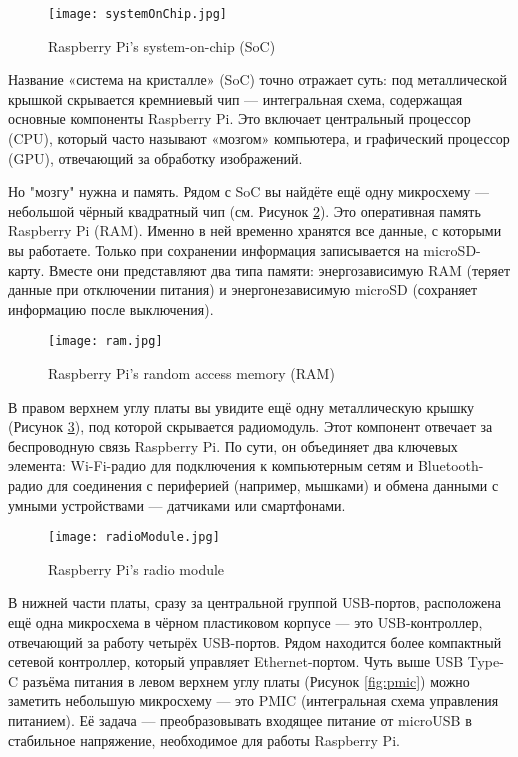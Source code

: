 \begin{figure}[H]
	\centering
	\texttt{[image: systemOnChip.jpg]}
	\caption{Raspberry Pi’s system-on-chip (SoC)}
	\label{fig:soc}
\end{figure}

Название «система на кристалле» (SoC) точно отражает суть: под металлической крышкой скрывается кремниевый чип — интегральная схема, содержащая основные компоненты Raspberry Pi. Это включает центральный процессор (CPU), который часто называют «мозгом» компьютера, и графический процессор (GPU), отвечающий за обработку изображений.

Но "мозгу" нужна и память. Рядом с SoC вы найдёте ещё одну микросхему — небольшой чёрный квадратный чип (см. Рисунок \ref{fig:ram}). Это оперативная память Raspberry Pi (RAM). Именно в ней временно хранятся все данные, с которыми вы работаете. Только при сохранении информация записывается на microSD-карту. Вместе они представляют два типа памяти: энергозависимую RAM (теряет данные при отключении питания) и энергонезависимую microSD (сохраняет информацию после выключения).

\begin{figure}[H]
	\centering
	\texttt{[image: ram.jpg]}
	\caption{Raspberry Pi’s random access memory (RAM)}
	\label{fig:ram}
\end{figure}

В правом верхнем углу платы вы увидите ещё одну металлическую крышку (Рисунок \ref{fig:radio_module}), под которой скрывается радиомодуль. Этот компонент отвечает за беспроводную связь Raspberry Pi. По сути, он объединяет два ключевых элемента: Wi-Fi-радио для подключения к компьютерным сетям и Bluetooth-радио для соединения с периферией (например, мышками) и обмена данными с умными устройствами — датчиками или смартфонами.

\begin{figure}[H]
	\centering
	\texttt{[image: radioModule.jpg]}
	\caption{Raspberry Pi’s radio module}
	\label{fig:radio_module}
\end{figure}

В нижней части платы, сразу за центральной группой USB-портов, расположена ещё одна микросхема в чёрном пластиковом корпусе — это USB-контроллер, отвечающий за работу четырёх USB-портов. Рядом находится более компактный сетевой контроллер, который управляет Ethernet-портом. Чуть выше USB Type-C разъёма питания в левом верхнем углу платы (Рисунок \ref{fig:pmic}) можно заметить небольшую микросхему — это PMIC (интегральная схема управления питанием). Её задача — преобразовывать входящее питание от microUSB в стабильное напряжение, необходимое для работы Raspberry Pi.

